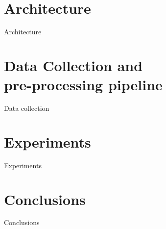 \documentclass{sig-alternate-05-2015}
\begin{document}
\section{Architecture}
Architecture

\section{Data Collection and \\pre-processing pipeline}
Data collection

\section{Experiments}
Experiments

\section{Conclusions}
Conclusions

%

%
%
\end{document}
